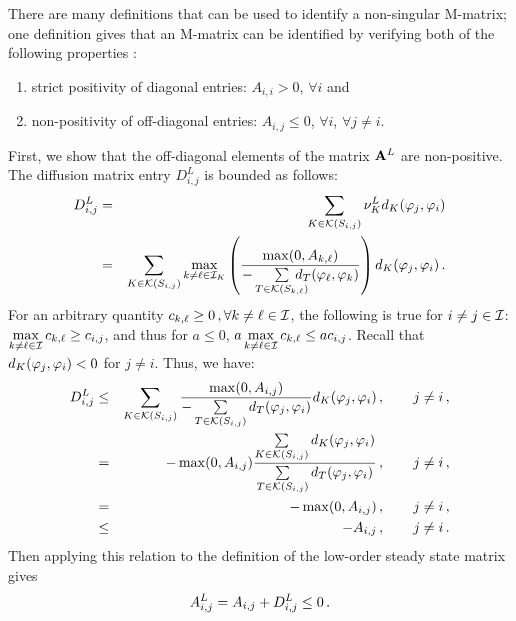 
\begin{prf}
  There are many definitions that can be used to identify a non-singular
  M-matrix; one
  definition gives that an M-matrix can be identified by verifying both of the
  following properties \cite{plemmons}:
  \begin{enumerate}
    \item strict positivity of diagonal entries: $A_{i,i} > 0$, $\forall i$ and
    \item non-positivity of off-diagonal entries: $A_{i,j} \leq 0$,
      $\forall i$, $\forall j\ne i$.
  \end{enumerate}
First, we show that the off-diagonal elements of the matrix
$\A^L$ are non-positive.
The diffusion matrix entry $D^L_{i,j}$ is bounded as follows:
\begin{eqnarray*}
   D_{i,j}^L & = & \sumKSij\nu^L_K d_K(\test_j,\test_i)\\
          & = & \sumKSij\max\limits_{k\ne \ell\in \indices_K}
            \pr{\frac{\max(0,A_{k,\ell})}
              {-\sum\limits_{T\in\mathcal{K}(S_{k,\ell})}
              \mkern-20mu d_T(\test_\ell,\test_k)}} d_K(\test_j,\test_i) \eqp
\end{eqnarray*}
For an arbitrary quantity $c_{k,\ell} \geq 0 \eqc \forall k\ne\ell\in\indices$,
the following is true for $i\ne j\in\indices$:
$\max\limits_{k\ne\ell\in\indices}c_{k,\ell} \geq c_{i,j}$, and thus for $a\leq 0$,
$a\max\limits_{k\ne\ell\in\indices}c_{k,\ell} \leq a c_{i,j}$.
Recall that $d_K(\test_j,\test_i) < 0$ for $j\ne i$.
Thus, we have:
\begin{eqnarray*}
   D^L_{i,j} & \le & \sumKSij \frac{\max(0,A_{i,j})}
    {-\sumKSij[T] d_T(\test_j,\test_i)}
    d_K(\test_j,\test_i) \eqc \qquad j\ne i\eqc\\
      & = & -\max(0,A_{i,j}) \frac{\sumKSij d_K(\test_j,\test_i)}
        {\sumKSij[T] d_T(\test_j,\test_i)} \eqc \qquad j\ne i\eqc\\
        & = & -\max(0,A_{i,j}) \eqc \qquad j\ne i\eqc\\
        & \le & -A_{i,j}\eqc \qquad j\ne i\eqp
\end{eqnarray*}
Then applying this relation to the definition of the low-order steady state
matrix gives
\begin{equation*}
  A^L_{i,j}  =   A_{i,j} + D_{i,j}^L  \le 0  \eqp
\end{equation*}

\end{prf}
